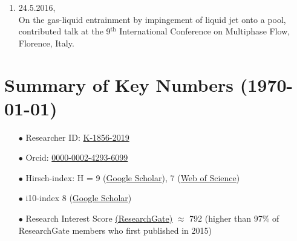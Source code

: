 \documentclass[10pt,a4paper,colorlinks,linkcolor=blue,urlcolor=blue,citecolor=blue]{moderncv}
\begin{document}
\begin{enumerate}[leftmargin=0.75cm]
	\item 24.5.2016,\\
	On the gas-liquid entrainment by impingement of liquid jet onto a pool,\\
	contributed talk at the 9$^\text{th}$ International Conference on Multiphase Flow, Florence, Italy.

\end{enumerate}


\section{\textbf{Summary of Key Numbers (\today)}}
\begin{enumerate}[leftmargin=0.75cm]
	\item[$\bullet$] Researcher ID: \href{https://www.webofscience.com/wos/author/record/K-1856-2019}{K-1856-2019}
	\item[$\bullet$] Orcid: \href{https://orcid.org/0000-0002-4293-6099}{0000-0002-4293-6099}
	\item[$\bullet$] Hirsch-index: H = 9 (\href{https://scholar.google.com/citations?hl=en&user=67aQviYAAAAJ}{Google Scholar}), 7 (\href{https://www.webofscience.com/wos/author/record/K-1856-2019}{Web of Science})
	\item[$\bullet$] i10-index 8 (\href{https://scholar.google.com/citations?hl=en&user=67aQviYAAAAJ}{Google Scholar})
	\item[$\bullet$] Research Interest Score \href{https://www.researchgate.net/profile/Vatsal-Sanjay-2}{(ResearchGate)} $\approx$ 792 (higher than 97\% of ResearchGate members who first published in 2015)
\end{enumerate}
\end{document}
